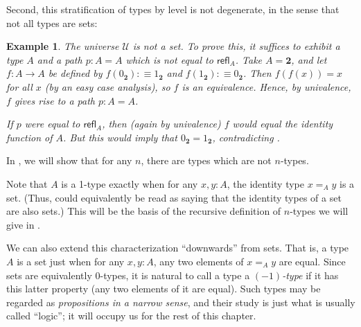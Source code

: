 \documentclass[12pt]{article}
\newcommand{\bfalse}{{0_{\bool}}}
\newcommand{\bool}{\ensuremath{\mathbf{2}}\xspace}
\newcommand{\btrue}{{1_{\bool}}}
\newcommand{\defeq}{\vcentcolon\equiv}
\newcommand{\id}[3][]{\ensuremath{#2 =_{#1} #3}\xspace}
\newcommand{\refl}[1]{\ensuremath{\mathsf{refl}_{#1}}\xspace}
\newcommand{\UU}{\ensuremath{\mathcal{U}}\xspace}
\newcommand{\vcentcolon}{:\!\!}
\newcounter{mathcount}
\newtheorem{preeg}{Example}
\newenvironment{eg}{\begin{preeg}}{\end{preeg}\addtocounter{mathcount}{1}}
\let\type\UU
\begin{document}
Second, this stratification of types by level is not degenerate, in the
sense that not all types are sets:  

\begin{eg}\label{thm:type-is-not-a-set}
  The universe \type is not a set.
  To prove this, it suffices to exhibit a type $A$ and a path $p:A=A$ which is not equal to $\refl A$.
  Take $A=\bool$, and let $f:A\to A$ be defined by $f(\bfalse)\defeq \btrue$ and $f(\btrue)\defeq \bfalse$.
  Then $f(f(x))=x$ for all $x$ (by an easy case analysis), so $f$ is an equivalence.
  Hence, by univalence, $f$ gives rise to a path $p:A=A$.

  If $p$ were equal to $\refl A$, then (again by univalence) $f$ would equal the identity function of $A$.
  But this would imply that $\bfalse=\btrue$, contradicting .
\end{eg}

In , we will show that for any $n$, there are types which are not $n$-types.

Note that $A$ is a 1-type exactly when for any $x,y:A$, the identity type $\id[A]xy$ is a set.
(Thus,  could equivalently be read as saying that the identity types of a set are also sets.)
This will be the basis of the recursive definition of $n$-types we will give in .

We can also extend this characterization ``downwards'' from sets.
That is, a type $A$ is a set just when for any $x,y:A$, any two elements of $\id[A]xy$ are equal.
Since sets are equivalently 0-types, it is natural to call a type a \emph{$(-1)$-type} if it has this latter property (any two elements of it are equal).
Such types may be regarded as \emph{propositions in a narrow sense}, and their study is just what is usually called ``logic''; it will occupy us for the rest of this chapter.

%
%
\end{document}

